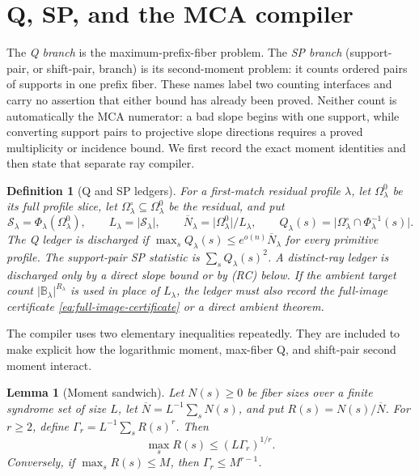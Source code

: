 \documentclass[12pt,a4paper]{amsart}
\numberwithin{equation}{section}
\newtheorem{lemma}[lemma]{Lemma}
\newtheorem{definition}[definition]{Definition}
\theoremstyle{remark}
\newcommand{\B}{\mathbb B}
\newcommand{\Omc}{\Omega^{\circ}}
\newcommand{\Scal}{\mathcal S}
\newcommand{\barN}{\overline N}
\newcommand{\abs}[1]{\lvert #1\rvert}
\begin{document}
\section{Q, SP, and the MCA compiler}\label{sec:compiler}

The \emph{Q branch} is the maximum-prefix-fiber problem.  The \emph{SP
branch} (support-pair, or shift-pair, branch) is its second-moment problem:
it counts ordered pairs of supports in one prefix fiber.  These names label
two counting interfaces and carry no assertion that either bound has
already been proved.  Neither count is automatically the MCA numerator: a
bad slope begins with one support, while converting support pairs to
projective slope directions requires a proved multiplicity or incidence
bound.  We first record the exact moment identities and then state that
separate ray compiler.

\begin{definition}[Q and SP ledgers]\label{def:q-sp}
For a first-match residual profile \(\lambda\), let \(\Omega^0_\lambda\)
be its full profile slice, let
\(\Omc_\lambda\subseteq\Omega^0_\lambda\) be the residual, and put
\[
 \Scal_\lambda=\Phi_\lambda(\Omega^0_\lambda),\qquad
 L_\lambda=\abs{\Scal_\lambda},\qquad
 \barN_\lambda=\abs{\Omega^0_\lambda}/L_\lambda,
 \qquad
 Q_\lambda(s)=\abs{\Omc_\lambda\cap\Phi_\lambda^{-1}(s)}.
\]
The Q ledger is discharged if
\(\max_sQ_\lambda(s)\le e^{o(n)}\barN_\lambda\) for every primitive
profile.  The support-pair SP statistic is
\(\sum_sQ_\lambda(s)^2\).  A distinct-ray ledger is discharged only by a
direct slope bound or by \textup{(RC)} below.
If the ambient target count \(\abs{\B_\lambda}^{R_\lambda}\) is used in
place of \(L_\lambda\), the ledger must also record the full-image
certificate \eqref{eq:full-image-certificate} or a direct ambient theorem.
\end{definition}


The compiler uses two elementary inequalities repeatedly.  They are included to make explicit how the logarithmic moment, max-fiber Q, and shift-pair second moment interact.

\begin{lemma}[Moment sandwich]\label{lem:moment-sandwich-full}
Let \(N(s)\ge0\) be fiber sizes over a finite syndrome set of size \(L\), let \(\barN=L^{-1}\sum_sN(s)\), and put \(R(s)=N(s)/\barN\).  For \(r\ge2\), define \(\Gamma_r=L^{-1}\sum_sR(s)^r\).  Then
\[
        \max_s R(s)\le (L\Gamma_r)^{1/r}.
\]
Conversely, if \(\max_sR(s)\le M\), then \(\Gamma_r\le M^{r-1}\).
\end{lemma}
\end{document}
